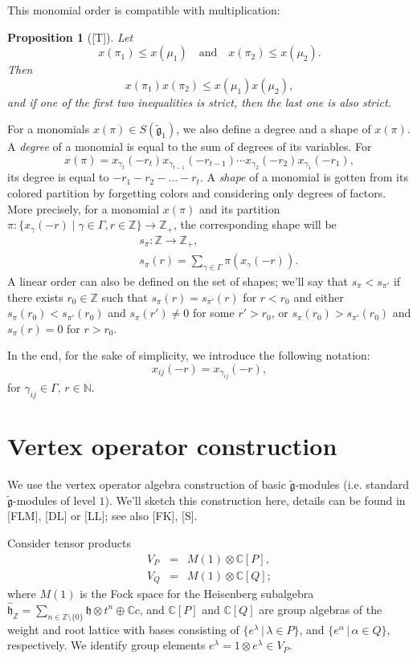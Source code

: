 \documentclass[a4paper, 10pt,oneside]{amsart}
\newtheorem{prop}[tm]{Proposition}
\begin{document}
This monomial order is compatible with multiplication:
\begin{prop}[{[T]}] \label{uredjaj}
Let $$x(\pi_1)\leq x(\mu_1)\quad \textrm{and} \quad x(\pi_2) \leq
x(\mu_2).$$ Then $$x(\pi_1)x(\pi_2) \leq x(\mu_1)x(\mu_2),$$ and if
one of the first two inequalities is strict, then the last one is
also strict.
\end{prop}

For a monomials $x(\pi)\in S({\tilde{{\mathfrak g}}}_1)$, we also define a degree
and a shape of $x(\pi)$. A \emph{degree} of a monomial is equal to the
sum of degrees of its variables. For
$$x(\pi) = x_{\gamma_t}(-r_t) x_{\gamma_{t-1}}(-r_{t-1})\cdots
x_{\gamma_2}(-r_2)x_{\gamma_1}(-r_1),$$ its degree is equal to
$-r_1-r_2-\dots-r_t$. A \emph{shape} of a monomial is gotten from its colored
partition by forgetting colors and considering only degrees of
factors. More precisely, for a monomial $x(\pi)$ and its partition
$\pi:\{x_\gamma(-r) \mid \gamma\in\Gamma,r\in {{\mathbb Z}}\}\to {{\mathbb Z}}_+$, the
corresponding shape will be
\begin{eqnarray*}
& & s_\pi:{{\mathbb Z}}\to{{\mathbb Z}}_+,\\
& & s_\pi(r)=\sum_{\gamma\in\Gamma}\pi(x_\gamma(-r)).
\end{eqnarray*}
A linear order can also be defined on the set of shapes; we'll say
that $s_\pi<s_{\pi'}$ if there exists $r_0\in{{\mathbb Z}}$ such that
$s_\pi(r)=s_{\pi'}(r)$ for  $r<r_0$ and either $s_\pi(r_0)<
s_{\pi'}(r_0)$ and $s_\pi(r')\neq 0$ for some $r'>r_0$, or
$s_\pi(r_0)>s_{\pi'}(r_0)$ and $s_\pi(r)=0$ for $r>r_0$.

In the end, for the sake of simplicity, we introduce the following
notation:
$$x_{ij}(-r)=x_{\gamma_{ij}}(-r),$$
 for $\gamma_{ij}\in\Gamma,\, r\in{{\mathbb N}}$.

\section{Vertex operator construction}

\label{voakonstr_sect} We use the vertex operator algebra construction
of basic ${\tilde{{\mathfrak g}}}$-modules (i.e. standard ${\tilde{{\mathfrak g}}}$-modules of level
$1$). We'll sketch this construction here, details can be found in [FLM], [DL] or [LL]; see also [FK], [S].

Consider tensor products
\begin{eqnarray*}
V_P & = & M(1)\otimes {{\mathbb C}} [P],\\
V_Q & = & M(1)\otimes {{\mathbb C}} [Q];
\end{eqnarray*}
where $M(1)$ is the Fock space for the Heisenberg subalgebra
${\hat{\mathfrak h}_{{\mathbb Z}}}=\sum_{n\in{{\mathbb Z}} \setminus\{0\}}{{\mathfrak h}}\otimes t^n \oplus {{\mathbb C}} c$, and ${{\mathbb C}}
[P]$ and ${{\mathbb C}} [Q]$ are group algebras of the weight and root lattice
with bases consisting of $\{e^\lambda\,|\,\lambda\in P\}$, and
$\{e^\alpha\,|\,\alpha\in Q\}$, respectively. We identify group elements
$e^\lambda=1\otimes e^\lambda\in V_P$.
\end{document}
